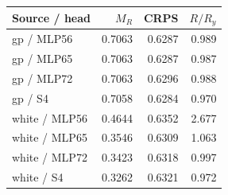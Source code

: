 \begin{tabular}{lrrr}
\toprule
Source / head & $M_R$ & CRPS & $R/R_y$ \\
\midrule
gp / MLP56 & 0.7063 & 0.6287 & 0.989 \\
gp / MLP65 & 0.7063 & 0.6287 & 0.987 \\
gp / MLP72 & 0.7063 & 0.6296 & 0.988 \\
gp / S4 & 0.7058 & 0.6284 & 0.970 \\
white / MLP56 & 0.4644 & 0.6352 & 2.677 \\
white / MLP65 & 0.3546 & 0.6309 & 1.063 \\
white / MLP72 & 0.3423 & 0.6318 & 0.997 \\
white / S4 & 0.3262 & 0.6321 & 0.972 \\
\bottomrule
\end{tabular}
